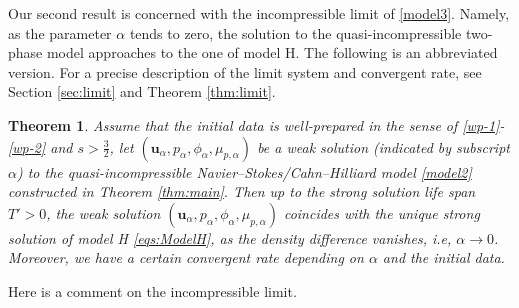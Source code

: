 \documentclass[reqno,a4paper,11pt]{amsart}
\theoremstyle{plain}
\newtheorem{theorem}{Theorem}[section]
\newtheorem{remark}[theorem]{Remark}
\numberwithin{equation}{section}
\newcommand{\bu}{\mathbf{u}}
\begin{document}
Our second result is concerned with the incompressible limit of \eqref{model3}. Namely, as the parameter $\alpha$ tends to zero, the solution to the quasi-incompressible two-phase model approaches to the one of model H. The following is an abbreviated version.
For a precise description of the limit system and convergent rate, see Section \ref{sec:limit} and Theorem \ref{thm:limit}.
\begin{theorem}
	\label{thm:main2}
	Assume that the initial data is well-prepared in the sense of \eqref{wp-1}-\eqref{wp-2} and $s> \frac{3}{2}$, let $(\bu_\alpha, p_\alpha, \phi_\alpha, \mu_{p,\alpha}) $ be a weak solution (indicated by subscript $\alpha$) to the quasi-incompressible Navier--Stokes/Cahn--Hilliard model \eqref{model2} constructed in Theorem \ref{thm:main}. Then up to the strong solution life span $ T' > 0 $, the weak solution $ (\bu_\alpha, p_\alpha, \phi_\alpha, \mu_{p,\alpha}) $ coincides with the unique strong solution of model H \eqref{eqs:ModelH}, as the density difference vanishes, i.e, $\alpha\rightarrow 0$. Moreover, we have a certain convergent rate depending on $ \alpha $ and the initial data.
\end{theorem}
Here is a comment on the incompressible limit.
	
	
\end{document}
